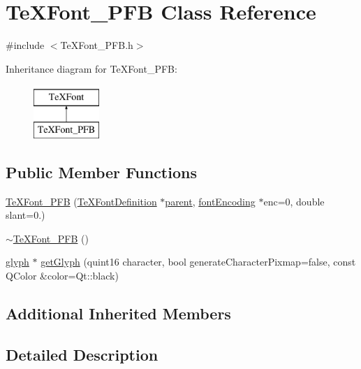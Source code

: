 \hypertarget{classTeXFont__PFB}{\section{Te\+X\+Font\+\_\+\+P\+F\+B Class Reference}
\label{classTeXFont__PFB}
}


{\ttfamily \#include $<$Te\+X\+Font\+\_\+\+P\+F\+B.\+h$>$}

Inheritance diagram for Te\+X\+Font\+\_\+\+P\+F\+B\+:\begin{figure}[H]
\begin{center}
\leavevmode
\includegraphics[height=2.000000cm]{classTeXFont__PFB}
\end{center}
\end{figure}
\subsection*{Public Member Functions}
\begin{DoxyCompactItemize}
\item 
\hyperlink{classTeXFont__PFB_aaca41f0eea2e82f68debdc234f0e16f7}{Te\+X\+Font\+\_\+\+P\+F\+B} (\hyperlink{classTeXFontDefinition}{Te\+X\+Font\+Definition} $\ast$\hyperlink{classTeXFont_a72d8eb1f0377749cf4a45dfabf1c3dd5}{parent}, \hyperlink{classfontEncoding}{font\+Encoding} $\ast$enc=0, double slant=0.)
\item 
\hyperlink{classTeXFont__PFB_ab84eb48ee973b7c38379db21c66ad9b3}{$\sim$\+Te\+X\+Font\+\_\+\+P\+F\+B} ()
\item 
\hyperlink{classglyph}{glyph} $\ast$ \hyperlink{classTeXFont__PFB_ac58a8a554d305b5b56f3c196f9b214d0}{get\+Glyph} (quint16 character, bool generate\+Character\+Pixmap=false, const Q\+Color \&color=Qt\+::black)
\end{DoxyCompactItemize}
\subsection*{Additional Inherited Members}


\subsection{Detailed Description}


